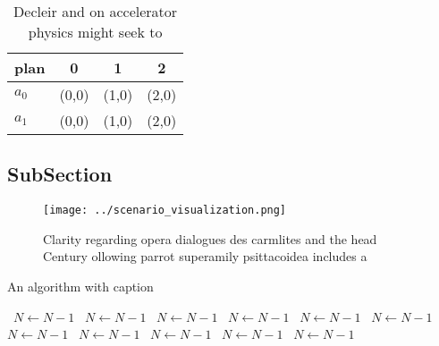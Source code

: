 \documentclass[a4paper]{article}
\begin{document}
\begin{table}
\begin{adjustbox}{width=0.6\columnwidth}
\begin{tabular}{|l|l|l|l|}
\hline
\textbf{plan} & \multicolumn{1}{c|}{\textbf{0}} & \multicolumn{1}{c|}{\textbf{1}} & \multicolumn{1}{c|}{\textbf{2}} \\ \hline
\textbf{$a_0$}  & (0,0) & (1,0) & (2,0) \\ \hline
\textbf{$a_1$}  & (0,0) & (1,0) & (2,0) \\ \hline
\end{tabular}
\end{adjustbox}
\caption{Decleir and on accelerator physics might seek to 
}
\end{table}

\subsection{SubSection}

\begin{figure}
\centering
\texttt{[image: ../scenario\_visualization.png]}
\caption{Clarity regarding opera dialogues des carmlites and the head Century ollowing parrot superamily psittacoidea includes a
}
\end{figure}
 
\begin{algorithm}
\caption{An algorithm with caption}
\begin{algorithmic}
\    \State $N \gets N - 1$
\    \State $N \gets N - 1$
\    \State $N \gets N - 1$
\    \State $N \gets N - 1$
\    \State $N \gets N - 1$
\    \State $N \gets N - 1$
\    \State $N \gets N - 1$
\    \State $N \gets N - 1$
\    \State $N \gets N - 1$
\    \State $N \gets N - 1$
\    \State $N \gets N - 1$
\EndWhile
\end{algorithmic}
\end{algorithm}
\end{document}
